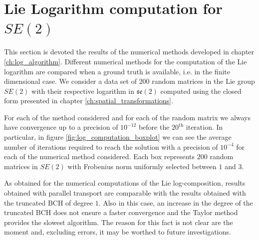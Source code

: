 \section{Lie Logarithm computation for $SE(2)$}\label{se:results_lie_logarithm_computations}

This section is devoted the results of the numerical methods developed in chapter \ref{ch:log_algorithm}. Different numerical methods for the computation of the Lie logarithm are compared when a ground truth is available, i.e. in the finite dimensional case. We consider a data set of $200$ random matrices in the Lie group $SE(2)$ with their respective logarithm in $\mathfrak{se}(2)$ computed using the closed form presented in chapter \ref{ch:spatial_transformations}. 

For each of the method considered and for each of the random matrix we always have convergence up to a precision of $10^{-12}$ before the $20^{\text{th}}$ iteration.
In particular, in figure \ref{fig:log_computation_boxplot} we can see the average number of iterations required to reach the solution with a precision of $10^{-4}$ for each of the numerical method considered. Each box represents $200$ random matrices in $SE(2)$ with Frobenius norm uniformly selected between $1$ and $3$.

As obtained for the numerical computations of the Lie log-composition, results obtained with parallel transport are comparable with the results obtained with the truncated BCH of degree $1$. Also in this case, an increase in the degree of the truncated BCH does not ensure a faster convergence and the Taylor method provides the slowest algorithm. The reason for this fact is not clear are the moment and, excluding errors, it may be worthed to future investigations.

